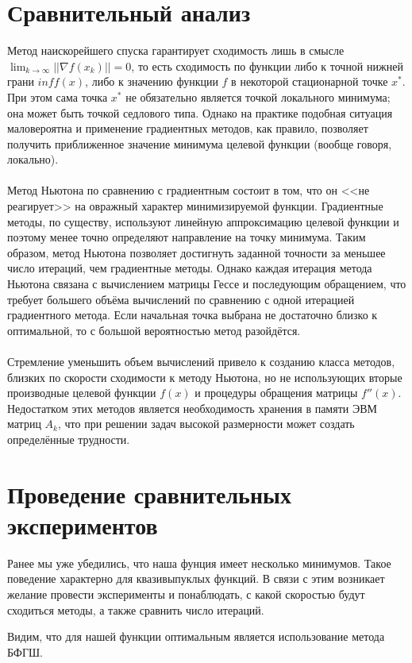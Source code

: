 \documentclass{article}
\begin{document}
\section{Сравнительный анализ}
\noindent Метод наискорейшего спуска гарантирует сходимость лишь в смысле $\lim_{k \to \infty}||\nabla f(x_k)||=0$, то есть сходимость по функции либо к точной нижней грани $inf f(x)$, либо к значению функции $f$ в некоторой  стационарной точке $x^{*}$. При этом сама точка $x^{*}$ не обязательно является точкой локального минимума; она может быть точкой седлового типа. Однако на практике подобная ситуация маловероятна и применение градиентных методов, как правило, позволяет получить приближенное значение минимума целевой функции (вообще говоря, локально).\\\\
\noindent Метод Ньютона по сравнению с градиентным состоит в том, что он <<не реагирует>> на овражный характер минимизируемой функции. Градиентные методы, по существу, используют линейную аппроксимацию целевой функции и поэтому менее точно определяют направление на точку минимума. Таким образом, метод Ньютона позволяет достигнуть заданной точности за меньшее число итераций, чем градиентные методы. Однако каждая итерация метода Ньютона связана с вычислением матрицы Гессе и последующим обращением, что требует большего объёма вычислений по сравнению с одной итерацией градиентного метода. Если начальная точка выбрана не достаточно близко к оптимальной, то с большой вероятностью метод разойдётся.
\\\\
\noindent Стремление уменьшить объем вычислений привело к созданию класса методов, близких по скорости сходимости к методу Ньютона, но не использующих вторые производные целевой функции $f(x)$ и процедуры обращения матрицы $f''(x)$. Недостатком этих методов является необходимость хранения в памяти ЭВМ матриц $A_k$, что при решении задач высокой размерности может создать определённые трудности.

\section{Проведение сравнительных экспериментов}
\noindent Ранее мы уже убедились, что наша фунция имеет несколько минимумов. Такое поведение характерно для квазивыпуклых функций. В связи с этим возникает желание провести эксперименты и понаблюдать, с какой скоростью будут сходиться методы, а также сравнить число итераций.
\begin{figure}[H]
\label{fig:image}
\end{figure}
\begin{figure}[H]
\label{fig:image}
\end{figure}
\noindent Видим, что для нашей функции  оптимальным является использование метода БФГШ.
\end{document}

